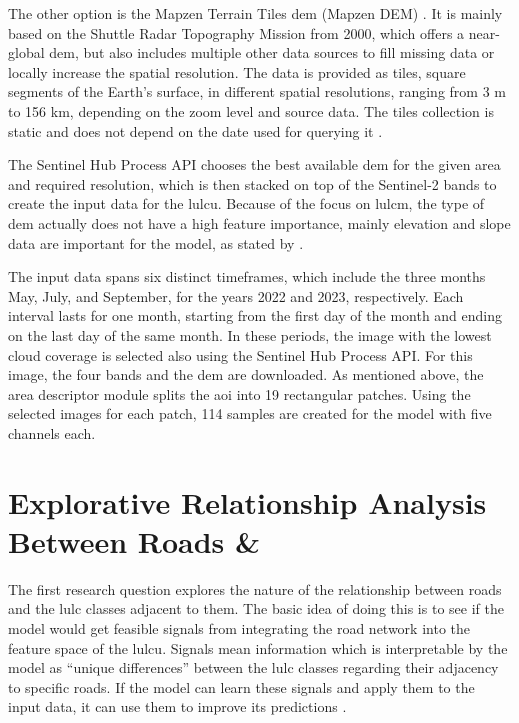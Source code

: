 The other option is the Mapzen Terrain Tiles \gls{dem} (Mapzen DEM) \autocite{Mapzen2024}. It is mainly based on the Shuttle Radar Topography Mission from 2000, which offers a near-global \gls{dem}, but also includes multiple other data sources to fill missing data or locally increase the spatial resolution. The data is provided as tiles, square segments of the Earth's surface, in different spatial resolutions, ranging from 3 m to 156 km, depending on the zoom level and source data. The tiles collection is static and does not depend on the date used for querying it \autocite{Mapzen2024}.

The Sentinel Hub Process API chooses the best available \gls{dem} for the given area and required resolution, which is then stacked on top of the Sentinel-2 bands to create the input data for the \gls{lulcu}. Because of the focus on \gls{lulcm}, the type of \gls{dem} actually does not have a high feature importance, mainly elevation and slope data are important for the model, as stated by \textcite{Tzepkenlis.Marthoglou.ea2023}.

The input data spans six distinct timeframes, which include the three months May, July, and September, for the years 2022 and 2023, respectively. Each interval lasts for one month, starting from the first day of the month and ending on the last day of the same month. In these periods, the image with the lowest cloud coverage is selected also using the Sentinel Hub Process API. For this image, the four bands and the \gls{dem} are downloaded. As mentioned above, the area descriptor module splits the \gls{aoi} into 19 rectangular patches. Using the selected images for each patch, 114 samples are created for the model with five channels each.

\section{Explorative Relationship Analysis Between Roads \& }
\label{subsec:explore}

The first research question explores the nature of the relationship between roads and the \gls{lulc} classes adjacent to them. The basic idea of doing this is to see if the model would get feasible signals from integrating the road network into the feature space of the \gls{lulcu}. Signals mean information which is interpretable by the model as \enquote{unique differences} between the \gls{lulc} classes regarding their adjacency to specific roads. If the model can learn these signals and apply them to the input data, it can use them to improve its predictions \autocite{LeCun.Bengio.ea2015,Vaswani.Shazeer.ea2017}.

